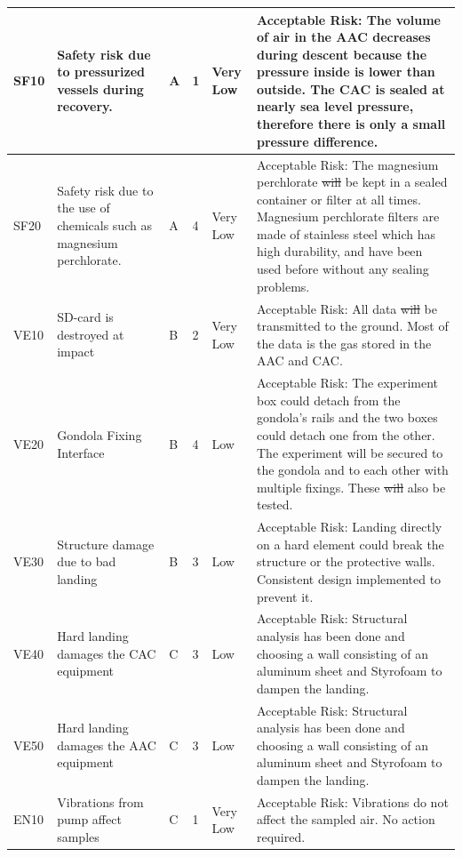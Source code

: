 \documentclass[a4paper,12pt,oneside]{article}
\providecommand{\DIFaddtex}[1]{{\protect\color{blue}\uwave{#1}}} %
\providecommand{\DIFdeltex}[1]{{\protect\color{red}\sout{#1}}}                      %
\providecommand{\DIFaddbegin}{} %
\providecommand{\DIFaddend}{} %
\providecommand{\DIFdelbegin}{} %
\providecommand{\DIFdelend}{} %
\providecommand{\DIFadd}[1]{\texorpdfstring{\DIFaddtex{#1}}{#1}} %
\providecommand{\DIFdel}[1]{\texorpdfstring{\DIFdeltex{#1}}{}} %
\newcommand{\DIFscaledelfig}{0.5}
\newlength{\DIFdelgraphicswidth} %
\newlength{\DIFdelgraphicsheight} %
\newcommand{\DIFaddincludegraphics}[2][]{{\color{blue}\fbox{\DIFOincludegraphics[#1]{#2}}}} %
\newcommand{\DIFdelincludegraphics}[2][]{%
\sbox{\DIFdelgraphicsbox}{\DIFOincludegraphics[#1]{#2}}%
\settoboxwidth{\DIFdelgraphicswidth}{\DIFdelgraphicsbox} %
\settoboxtotalheight{\DIFdelgraphicsheight}{\DIFdelgraphicsbox} %
\scalebox{\DIFscaledelfig}{%
\parbox[b]{\DIFdelgraphicswidth}{\usebox{\DIFdelgraphicsbox}\\[-\baselineskip] \rule{\DIFdelgraphicswidth}{0em}}\llap{\resizebox{\DIFdelgraphicswidth}{\DIFdelgraphicsheight}{%
\setlength{\unitlength}{\DIFdelgraphicswidth}%
\begin{picture}(1,1)%
\thicklines\linethickness{2pt} %
{\color[rgb]{1,0,0}\put(0,0){\framebox(1,1){}}}%
{\color[rgb]{1,0,0}\put(0,0){\line( 1,1){1}}}%
{\color[rgb]{1,0,0}\put(0,1){\line(1,-1){1}}}%
\end{picture}%
}\hspace*{3pt}}} %
} %
\DeclareRobustCommand{\DIFaddbegin}{\DIFOaddbegin \let\includegraphics\DIFaddincludegraphics} %
\DeclareRobustCommand{\DIFaddend}{\DIFOaddend \let\includegraphics\DIFOincludegraphics} %
\DeclareRobustCommand{\DIFdelbegin}{\DIFOdelbegin \let\includegraphics\DIFdelincludegraphics} %
\DeclareRobustCommand{\DIFdelend}{\DIFOaddend \let\includegraphics\DIFOincludegraphics} %
\begin{document}
\begin{landscape}
\begin{longtable}{|m{}| m{} |m{} |m{}|m{}| m{}|}
SF10 & Safety risk due to pressurized vessels during recovery. & A & 1 & \cellcolor[HTML]{34FF34}Very Low & Acceptable Risk: The volume of air in the AAC decreases during descent because the pressure inside is lower than outside. The CAC is sealed at nearly sea level pressure, therefore there is only a small pressure difference.  \\ \hline
SF20 & Safety risk due to the use of chemicals such as magnesium perchlorate. & A & 4 & \cellcolor[HTML]{34FF34}Very Low & Acceptable Risk: The magnesium perchlorate \DIFdelbegin \DIFdel{will }\DIFdelend \DIFaddbegin \DIFadd{was }\DIFaddend be kept in a sealed container or filter at all times. Magnesium perchlorate filters are made of stainless steel which has high durability, and have been used before without any sealing problems.  \\ \hline
VE10 & SD-card is destroyed at impact & B & 2 & \cellcolor[HTML]{34FF34}Very Low & Acceptable Risk: All data \DIFdelbegin \DIFdel{will }\DIFdelend \DIFaddbegin \DIFadd{was }\DIFaddend be transmitted to the ground. Most of the data is the gas stored in the AAC and CAC. \\ \hline
VE20 & Gondola Fixing Interface & B & 4 & \cellcolor[HTML]{FCFF2F}Low & Acceptable Risk: The experiment box could detach from the gondola’s rails and the two boxes could detach one from the other. The experiment will be secured to the gondola and to each other with multiple fixings. These \DIFdelbegin \DIFdel{will }\DIFdelend \DIFaddbegin \DIFadd{were }\DIFaddend also be tested. \\ \hline
VE30 & Structure damage due to bad landing & B & 3 & \cellcolor[HTML]{FCFF2F}Low & Acceptable Risk: Landing directly on a hard element could break the structure or the protective walls. Consistent design implemented to prevent it. \\ \hline
VE40 & Hard landing damages the CAC equipment & C & 3 & \cellcolor[HTML]{FCFF2F}Low & Acceptable Risk:  Structural analysis has been done and choosing a wall consisting of an aluminum sheet and Styrofoam to dampen the landing. \\ \hline
VE50 & Hard landing damages the AAC equipment & C & 3 & \cellcolor[HTML]{FCFF2F}Low & Acceptable Risk:  Structural analysis has been done and choosing a wall consisting of an aluminum sheet and Styrofoam to dampen the landing. \\ \hline
EN10 & Vibrations from pump affect samples & C & 1 & \cellcolor[HTML]{34FF34}Very Low & Acceptable Risk: Vibrations do not affect the sampled air. No action required. \\ \hline

\end{longtable}
\end{landscape}
\end{document}
